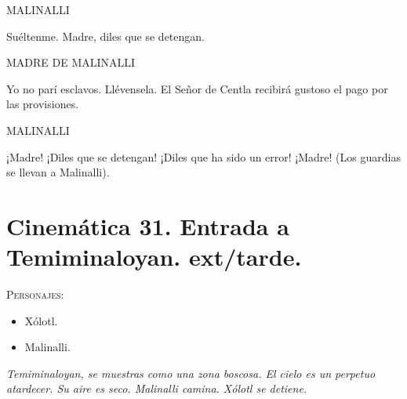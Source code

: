 \documentclass[11pt,letterpaper]{article}
\begin{document}
\begin{center}
MALINALLI
\\
\par
Suéltenme. Madre, diles que se detengan.
\\
\par
MADRE DE MALINALLI
\\
\par
Yo no parí esclavos. Llévensela. El Señor de Centla recibirá gustoso el pago por las provisiones.
\\
\par
MALINALLI
\\
\par
¡Madre! ¡Diles que se detengan! ¡Diles que ha sido un error! ¡Madre! (Los guardias se llevan a Malinalli).
\end{center}

\section{Cinemática 31. Entrada a Temiminaloyan. ext/tarde.}
 \textsc{Personajes}:
 \begin{itemize}
 \item Xólotl.
\item Malinalli.
 \end{itemize}
\textit{Temiminaloyan, se muestras como una zona boscosa. El cielo es un perpetuo atardecer. Su aire es seco. Malinalli camina. Xólotl se detiene.}
\end{document}
